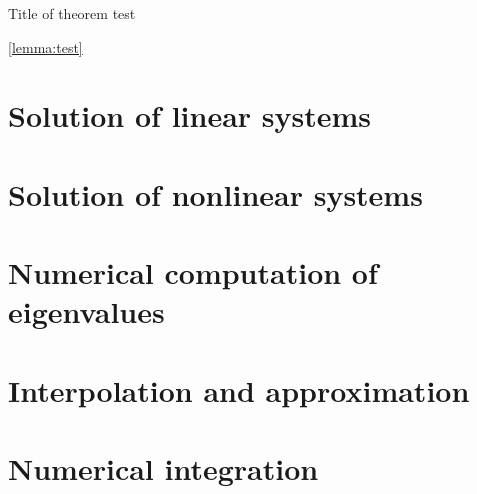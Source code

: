 \documentclass[11pt,a4paper]{report}
\begin{document}
\begin{theorem}
    {Title of theorem}
    test
\end{theorem}

\cref{lemma:test}

\chapter{Solution of linear systems}
\label{cha:solution_of_linear_systems}

\chapter{Solution of nonlinear systems}
\label{cha:solution_of_nonlinear_systems}

\chapter{Numerical computation of eigenvalues}%
\label{cha:numerical_computation_of_eigenvalues}

\chapter{Interpolation and approximation}%
\label{cha:interpolation_and_approximation}

\chapter{Numerical integration}
\label{cha:quadrature}

\nocite{*}
\printbibliography
\end{document}
